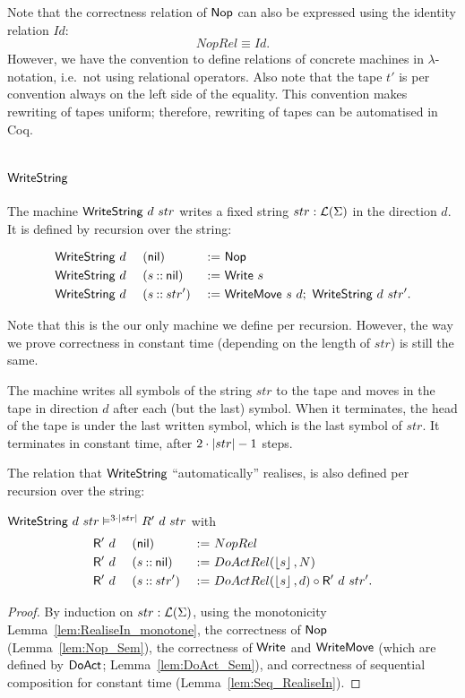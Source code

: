Note that the correctness relation of $\mathsf{Nop}$ can also be expressed using the identity relation $Id$:
\[
  NopRel \equiv Id.
\]
However, we have the convention to define relations of concrete machines in $\lambda$-notation, i.e.\ not using relational operators.  Also note that
the tape $t'$ is per convention always on the left side of the equality.  This convention makes rewriting of tapes uniform; therefore, rewriting of
tapes can be automatised in Coq.

\section{$\MS{WriteString}$}
\label{sec:WriteString}

The machine $\mathsf{WriteString}~d~str$ writes a fixed string $str:\mathcal{L}(\Sigma)$ in the direction $d$.  It is defined by recursion over the string:
\begin{definition}[$\MS{WriteString}$]
  \begin{alignat*}{3}
    &\mathsf{WriteString}~d~&&(\mathsf{nil})         &~:=~& \mathsf{Nop} \\
    &\mathsf{WriteString}~d~&&(s \mathbin{::} \mathsf{nil}) &~:=~& \mathsf{Write}~s \\
    &\mathsf{WriteString}~d~&&(s \mathbin{::} str') &~:=~& \mathsf{WriteMove}~s~d ;~ \mathsf{WriteString}~d~str'.
  \end{alignat*}
\end{definition}

Note that this is the our only machine we define per recursion.  However, the way we prove correctness in constant time (depending on the length of
$str$) is still the same.

The machine writes all symbols of the string $str$ to the tape and moves in the tape in direction $d$ after each (but the last) symbol.  When it
terminates, the head of the tape is under the last written symbol, which is the last symbol of $str$.  It terminates in constant time, after
$2\cdot\left| str \right|-1$ steps.

The relation that $\MS{WriteString}$ ``automatically'' realises, is also defined per recursion over the string:
\begin{lemma}
  $\mathsf{WriteString}~d~str \mathrel{\vDash^{3 \cdot \left| str \right|}} R'~d~str$ with
  \begin{alignat*}{3}
    &\mathsf{R'}~d~&&(\mathsf{nil}        ) &~:=~& NopRel \\
    &\mathsf{R'}~d~&&(s \mathbin{::} \mathsf{nil}) &~:=~& DoActRel(\left\lfloor {s} \right\rfloor, N) \\
    &\mathsf{R'}~d~&&(s \mathbin{::} str') &~:=~& DoActRel(\left\lfloor {s} \right\rfloor, d) \circ \mathsf{R'}~d~str'.
  \end{alignat*}
\end{lemma}
\begin{proof}
  By induction on $str:\mathcal{L}(\Sigma)$, using the monotonicity Lemma~\ref{lem:RealiseIn_monotone}, the correctness of $\mathsf{Nop}$ (Lemma~\ref{lem:Nop_Sem}),
  the correctness of $\mathsf{Write}$ and $\mathsf{WriteMove}$ (which are defined by $\mathsf{DoAct}$; Lemma~\ref{lem:DoAct_Sem}), and correctness of sequential
  composition for constant time (Lemma~\ref{lem:Seq_RealiseIn}).
\end{proof}

